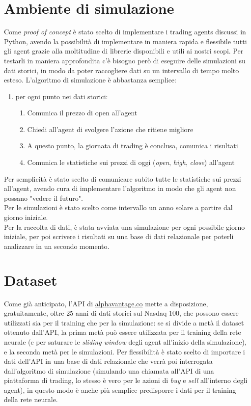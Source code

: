 \documentclass[binding=0.6cm]{sapthesis}
\begin{document}
		\section{Ambiente di simulazione}
			Come \textit{proof of concept} è stato scelto di implementare i trading agents discussi in Python, avendo la possibilità di implementare in maniera rapida e flessibile tutti gli agent grazie alla moltitudine
			di librerie disponibili e utili ai nostri scopi. Per testarli in maniera approfondita c'è bisogno però di eseguire delle simulazioni su dati storici, in modo da poter raccogliere dati su un intervallo di
			tempo molto esteso. L'algoritmo di simulazione è abbastanza semplice:
			\begin{enumerate}
				\item per ogni punto nei dati storici:
					\begin{enumerate}
						\item Comunica il prezzo di open all'agent
						\item Chiedi all'agent di svolgere l'azione che ritiene migliore
						\item A questo punto, la giornata di trading è conclusa, comunica i risultati
						\item Comunica le statistiche sui prezzi di oggi (\textit{open}, \textit{high}, \textit{close}) all'agent
					\end{enumerate}
			\end{enumerate}
			Per semplicità è stato scelto di comunicare subito tutte le statistiche sui prezzi all'agent, avendo cura di implementare l'algoritmo in modo che gli agent non possano "vedere il futuro". \\
			Per le simulazioni è stato scelto come intervallo un anno solare a partire dal giorno iniziale. \\
			Per la raccolta di dati, è stata avviata una simulazione per ogni possibile giorno iniziale, per poi scrivere i risultati su una base di dati relazionale per poterli analizzare in un secondo momento.
		\section{Dataset}
			Come già anticipato, l'API di \url{alphavantage.co} mette a disposizione, gratuitamente, oltre 25 anni di dati storici sul Nasdaq 100, che possono essere utilizzati sia per il training che per la simulazione:
			se si divide a metà il dataset ottenuto dall'API, la prima metà può essere utilizzata per il training della rete neurale (e per saturare le \textit{sliding window} degli agent all'inizio della simulazione),
			e la seconda metà per le simulazioni. Per flessibilità è stato scelto di importare i dati dell'API in una base di dati relazionale che verrà poi interrogata dall'algoritmo di simulazione (simulando una
			chiamata all'API di una piattaforma di trading, lo stesso è vero per le azioni di \textit{buy} e \textit{sell} all'interno degli agent), in questo modo è anche più semplice predisporre i dati per il training
			della rete neurale.
\end{document}
